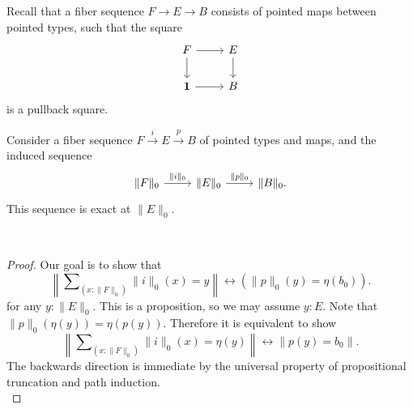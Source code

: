 \documentclass[handout]{beamer}
\newcommand{\brck}[1]{\|#1\|}
\newcommand{\trunc}[2]{\|#2\|_{#1}}
\newcommand{\unit}{\mathbf{1}}
\begin{document}
\begin{frame}
  Recall that a fiber sequence $F\to E\to B$ consists of pointed maps between pointed types, such that the square
  \begin{equation*}
    \begin{tikzcd}[ampersand replacement=\&]
      F \arrow[d] \arrow[r] \& E \arrow[d] \\
      \unit \arrow[r] \& B
    \end{tikzcd}
  \end{equation*}
  is a pullback square.
  
  \begin{lemma}
    Consider a fiber sequence $F\stackrel{i}{\to} E\stackrel{p}{\to} B$ of pointed types and maps, and the induced sequence
    \begin{equation*}
      \begin{tikzcd}[ampersand replacement=\&]
        \trunc{0}{F}\arrow[r,"\trunc{0}{i}"] \& \trunc{0}{E} \arrow[r,"\trunc{0}{p}"] \& \trunc{0}{B}.
      \end{tikzcd}
    \end{equation*}
    This sequence is exact at $\trunc{0}{E}$.
  \end{lemma}
\end{frame}

\begin{frame}
  \phantom{s}
  \\[3em]
  \begin{proof}
    Our goal is to show that
    \begin{equation*}
      \left\|\sum\nolimits_{(x:\trunc{0}{F})}\trunc{0}{i}(x)=y\right\|\leftrightarrow (\trunc{0}{p}(y)=\eta(b_0)).
    \end{equation*}
    for any $y:\trunc{0}{E}$. This is a proposition, so we may assume $y:E$. Note that $\trunc{0}{p}(\eta(y))=\eta(p(y))$. Therefore it is equivalent to show
    \begin{equation*}
      \left\|\sum\nolimits_{(x:\trunc{0}{F})}\trunc{0}{i}(x)=\eta(y)\right\|\leftrightarrow \brck{p(y)=b_0}.
    \end{equation*}
    The backwards direction is immediate by the universal property of propositional truncation and path induction. \\[10em]
  \end{proof}
\end{frame}
\end{document}
